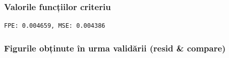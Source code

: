 \documentclass[12pt,english]{article}
\begin{document}
\subsubsection {Valorile funcțiilor criteriu }
\begin{lstlisting}
FPE: 0.004659, MSE: 0.004386
\end{lstlisting}
\subsubsection {Figurile obținute în urma validării (resid \& compare) }
\begin{center}
\end{center}
\begin{center}
\end{center}
\end{document}
